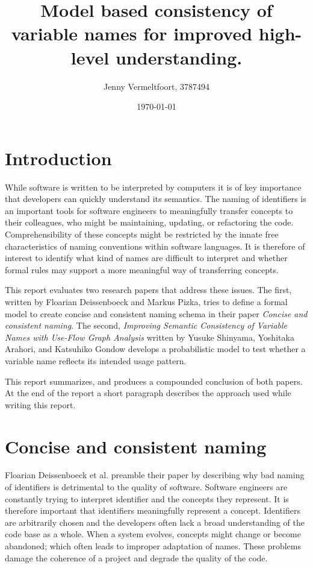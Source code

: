 \documentclass[a4paper,12pt]{article}
\begin{document}
\title{Model based consistency of variable names for improved high-level understanding.}
\author{Jenny Vermeltfoort, 3787494}
\date{\today}
\maketitle

\sectionfont{\centering\MakeUppercase}
\begin{multicols}{2}
\linenumbers

\section*{Introduction}
While software is written to be interpreted by computers it is of key importance that developers can quickly understand its semantics. The naming of identifiers is an important tools for software engineers to meaningfully transfer concepts to their colleagues, who might be maintaining, updating, or refactoring the code. Comprehensibility of these concepts might be restricted by the innate free characteristics of naming conventions within software languages. It is therefore of interest to identify what kind of names are difficult to interpret and whether formal rules may support a more meaningful way of transferring concepts.

This report evaluates two research papers that address these issues. The first, written by Floarian Deissenboeck and Markus Pizka, tries to define a formal model to create concise and consistent naming schema in their paper \textit{Concise and consistent naming}.\cite{deisenbock_concise_2005} The second, \textit{Improving Semantic Consistency of Variable Names with Use-Flow Graph Analysis} written by Yusuke Shinyama, Yoshitaka Arahori, and Katsuhiko Gondow develops a probabilistic model to test whether a variable name reflects its intended usage pattern.\cite{shinyama_improving_2021}

This report summarizes, and produces a compounded conclusion of both papers. At the end of the report a short paragraph describes the approach used while writing this report.

\section*{Concise and consistent naming}
Floarian Deissenboeck et al. preamble their paper by describing why bad naming of identifiers is detrimental to the quality of software.\cite{deisenbock_concise_2005} Software engineers are constantly trying to interpret identifier and the concepts they represent. It is therefore important that identifiers meaningfully represent a concept. Identifiers are arbitrarily chosen and the developers often lack a broad understanding of the code base as a whole. When a system evolves, concepts might change or become abandoned; which often leads to improper adaptation of names. These problems damage the coherence of a project and degrade the quality of the code.


\end{multicols}
\end{document}
